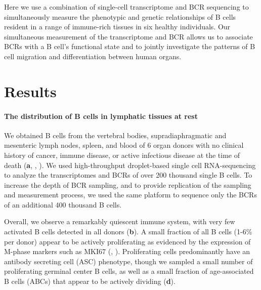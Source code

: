 Here we use a combination of single-cell transcriptome and BCR sequencing to simultaneously measure the phenotypic and genetic relationships of B cells resident in a range of immune-rich tissues in six healthy individuals. Our simultaneous measurement of the transcriptome and BCR allows us to associate BCRs with a B cell's functional state and to jointly investigate the patterns of B cell migration and differentiation between human organs.
\section{Results}

\paragraph*{The distribution of B cells in lymphatic tissues at rest}

\noindent We obtained B cells from the vertebral bodies, supradiaphragmatic and mesenteric lymph nodes, spleen, and blood of 6 organ donors with no clinical history of cancer, immune disease, or active infectious disease at the time of death (\textbf{a}, , \methods). We used high-throughput droplet-based single cell RNA-sequencing to analyze the transcriptomes and BCRs of over 200 thousand single B cells. To increase the depth of BCR sampling, and to provide replication of the sampling and measurement process, we used the same platform to sequence only the BCRs of an additional 400 thousand B cells. 

Overall, we observe a remarkably quiescent immune system, with very few activated B cells detected in all donors (\textbf{b}). A small fraction of all B cells (1-6\% per donor) appear to be actively proliferating as evidenced by the expression of M-phase markers such as MKI67 (\methods, ).  Proliferating cells predominantly have an antibody secreting cell (ASC) phenotype, though we sampled a small number of proliferating germinal center B cells, as well as a small fraction of age-associated B cells (ABCs) that appear to be actively dividing (\textbf{d}).

